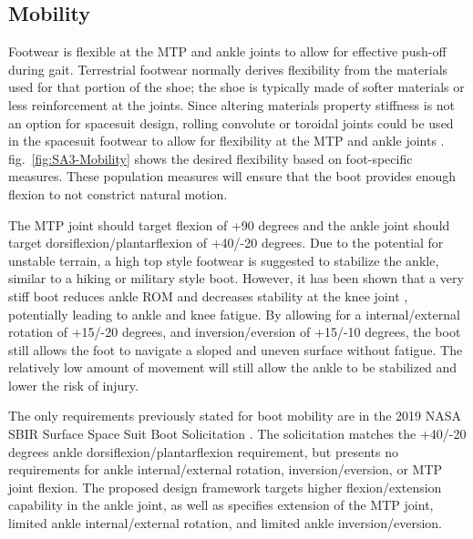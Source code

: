 \documentclass[defaultstyle,11pt]{comps}
\begin{document}
\hypertarget{mobility}{%
\subsection{Mobility}\label{mobility}}

Footwear is flexible at the MTP and ankle joints to allow for effective push-off during gait. Terrestrial footwear normally derives flexibility from the materials used for that portion of the shoe; the shoe is typically made of softer materials or less reinforcement at the joints. Since altering materials property stiffness is not an option for spacesuit design, rolling convolute or toroidal joints could be used in the spacesuit footwear to allow for flexibility at the MTP and ankle joints \citep{Harris2001}. fig.~\ref{fig:SA3-Mobility} shows the desired flexibility based on foot-specific measures. These population measures will ensure that the boot provides enough flexion to not constrict natural motion.

The MTP joint should target flexion of +90 degrees and the ankle joint should target dorsiflexion/plantarflexion of +40/-20 degrees.
Due to the potential for unstable terrain, a high top style footwear is suggested to stabilize the ankle, similar to a hiking or military style boot.
However, it has been shown that a very stiff boot reduces ankle ROM and decreases stability at the knee joint \citep{Bohm2010}, potentially leading to ankle and knee fatigue.
By allowing for a internal/external rotation of +15/-20 degrees, and inversion/eversion of +15/-10 degrees, the boot still allows the foot to navigate a sloped and uneven surface without fatigue.
The relatively low amount of movement will still allow the ankle to be stabilized and lower the risk of injury.

The only requirements previously stated for boot mobility are in the 2019 NASA SBIR Surface Space Suit Boot Solicitation \citep{NASA2019}.
The solicitation matches the +40/-20 degrees ankle dorsiflexion/plantarflexion requirement, but presents no requirements for ankle internal/external rotation, inversion/eversion, or MTP joint flexion.
The proposed design framework targets higher flexion/extension capability in the ankle joint, as well as specifies extension of the MTP joint, limited ankle internal/external rotation, and limited ankle inversion/eversion.
\end{document}
